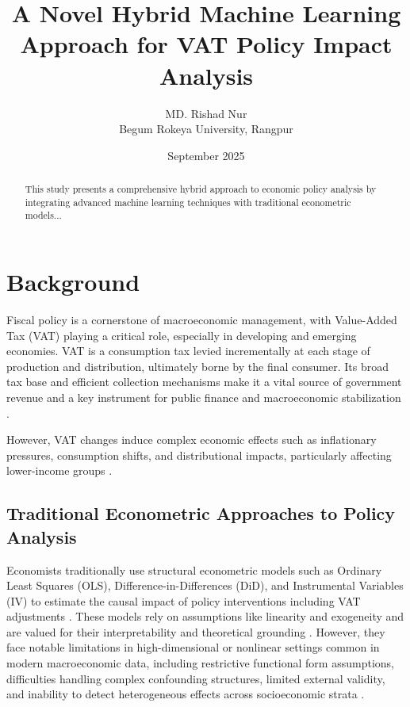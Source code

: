 \documentclass[12pt,a4paper]{article}
\title{A Novel Hybrid Machine Learning Approach for VAT Policy Impact Analysis}
\author{MD. Rishad Nur \\ Begum Rokeya University, Rangpur}
\date{September 2025}
\begin{document}
\maketitle

\begin{abstract}
This study presents a comprehensive hybrid approach to economic policy analysis by integrating advanced machine learning techniques with traditional econometric models...
\end{abstract}

\section{Background}
Fiscal policy is a cornerstone of macroeconomic management, with Value-Added Tax (VAT) playing a critical role, especially in developing and emerging economies. VAT is a consumption tax levied incrementally at each stage of production and distribution, ultimately borne by the final consumer. Its broad tax base and efficient collection mechanisms make it a vital source of government revenue and a key instrument for public finance and macroeconomic stabilization \citep[see section 1.1]{main}.

However, VAT changes induce complex economic effects such as inflationary pressures, consumption shifts, and distributional impacts, particularly affecting lower-income groups \citep[section 1.1]{main}.

\subsection*{Traditional Econometric Approaches to Policy Analysis}
Economists traditionally use structural econometric models such as Ordinary Least Squares (OLS), Difference-in-Differences (DiD), and Instrumental Variables (IV) to estimate the causal impact of policy interventions including VAT adjustments \citep[section 2.1]{main}. These models rely on assumptions like linearity and exogeneity and are valued for their interpretability and theoretical grounding \citep{heckman2008, heckman2023}. However, they face notable limitations in high-dimensional or nonlinear settings common in modern macroeconomic data, including restrictive functional form assumptions, difficulties handling complex confounding structures, limited external validity, and inability to detect heterogeneous effects across socioeconomic strata \citep[section 2.2]{main}.
\end{document}
